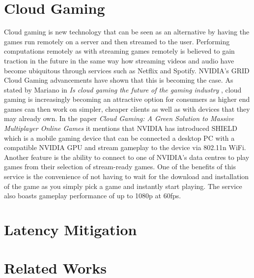 \section{Cloud Gaming}
Cloud gaming is new technology that can be seen as an alternative by having the games run remotely on a server and then streamed to the user. Performing computations remotely as with streaming games remotely is believed to gain traction in the future in the same way how streaming videos and audio have become ubiquitous through services such as Netflix and Spotify. NVIDIA's GRID Cloud Gaming advancements have shown that this is becoming the case. As stated by Mariano in \textit{Is cloud gaming the future of the gaming industry} \cite{mariano2015cloud}, cloud gaming is increasingly becoming an attractive option for consumers as higher end games can then work on simpler, cheaper clients as well as with devices that they may already own.
\parls
In the paper \textit{Cloud Gaming: A Green Solution to Massive Multiplayer Online Games} \cite{chuah2014cloud} it mentions that NVIDIA has introduced SHIELD which is a mobile gaming device that can be connected a desktop PC with a compatible NVIDIA GPU and stream gameplay to the device via 802.11n WiFi. Another feature is the ability to connect to one of NVIDIA's data centres to play games from their selection of stream-ready games. One of the benefits of this service is the convenience of not having to wait for the download and installation of the game as you simply pick a game and instantly start playing. The service also boasts gameplay performance of up to 1080p at 60fps.

\section{Latency Mitigation}
\lipsum[1-1]

\section{Related Works}
\lipsum[1-1]